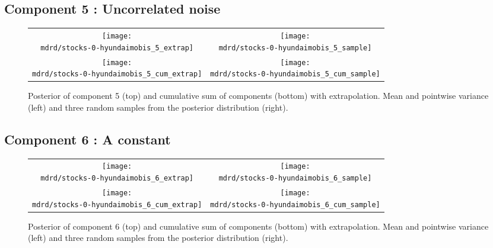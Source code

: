 \documentclass{article} %
\begin{document}
\subsection{Component 5 : Uncorrelated noise}



\begin{figure}[H]
\newcommand{\wmgd}{0.5\columnwidth}
\newcommand{\hmgd}{3.0cm}
\newcommand{\mdrd}{stocks-0-hyundaimobis}
\newcommand{\mbm}{\hspace{-0.3cm}}
\begin{tabular}{cc}
\mbm \texttt{[image: \\mdrd/stocks-0-hyundaimobis\_5\_extrap]} & \texttt{[image: \\mdrd/stocks-0-hyundaimobis\_5\_sample]} \\
\mbm \texttt{[image: \\mdrd/stocks-0-hyundaimobis\_5\_cum\_extrap]} & \texttt{[image: \\mdrd/stocks-0-hyundaimobis\_5\_cum\_sample]}
\end{tabular}
\caption{Posterior of component 5 (top) and cumulative sum of components (bottom) with extrapolation. Mean and pointwise variance (left) and three random samples from the posterior distribution (right).}
\label{fig:extrap5}
\end{figure}

\subsection{Component 6 : A constant}



\begin{figure}[H]
\newcommand{\wmgd}{0.5\columnwidth}
\newcommand{\hmgd}{3.0cm}
\newcommand{\mdrd}{stocks-0-hyundaimobis}
\newcommand{\mbm}{\hspace{-0.3cm}}
\begin{tabular}{cc}
\mbm \texttt{[image: \\mdrd/stocks-0-hyundaimobis\_6\_extrap]} & \texttt{[image: \\mdrd/stocks-0-hyundaimobis\_6\_sample]} \\
\mbm \texttt{[image: \\mdrd/stocks-0-hyundaimobis\_6\_cum\_extrap]} & \texttt{[image: \\mdrd/stocks-0-hyundaimobis\_6\_cum\_sample]}
\end{tabular}
\caption{Posterior of component 6 (top) and cumulative sum of components (bottom) with extrapolation. Mean and pointwise variance (left) and three random samples from the posterior distribution (right).}
\label{fig:extrap6}
\end{figure}
\end{document}

